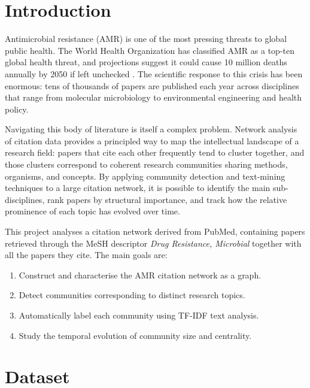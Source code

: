 \documentclass[12pt,a4paper]{article}
\begin{document}
\tableofcontents
\newpage

\section{Introduction}

Antimicrobial resistance (AMR) is one of the most pressing threats to global public health.
The World Health Organization has classified AMR as a top-ten global health threat,
and projections suggest it could cause 10 million deaths annually by 2050 if left unchecked
\cite{who_amr_2015}.
The scientific response to this crisis has been enormous: tens of thousands of papers are
published each year across disciplines that range from molecular microbiology to
environmental engineering and health policy.

Navigating this body of literature is itself a complex problem.
Network analysis of citation data provides a principled way to map the intellectual
landscape of a research field: papers that cite each other frequently tend to cluster
together, and those clusters correspond to coherent research communities sharing methods,
organisms, and concepts.
By applying community detection and text-mining techniques to a large citation network,
it is possible to identify the main sub-disciplines, rank papers by structural
importance, and track how the relative prominence of each topic has evolved over time.

This project analyses a citation network derived from PubMed, containing papers
retrieved through the MeSH descriptor \textit{Drug Resistance, Microbial} together
with all the papers they cite.
The main goals are:
\begin{enumerate}
    \item Construct and characterise the AMR citation network as a graph.
    \item Detect communities corresponding to distinct research topics.
    \item Automatically label each community using TF-IDF text analysis.
    \item Study the temporal evolution of community size and centrality.
\end{enumerate}

\section{Dataset}
\end{document}
